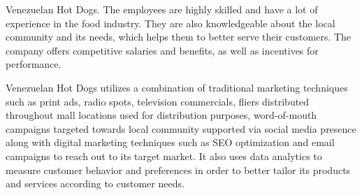 Venezuelan Hot Dogs. The employees are highly skilled and have a lot of experience in the food industry. They are also knowledgeable about the local community and its needs, which helps them to better serve their customers. The company offers competitive salaries and benefits, as well as incentives for performance. 

 Venezuelan Hot Dogs utilizes a combination of traditional marketing techniques such as print ads, radio spots, television commercials, fliers distributed throughout mall locations used for distribution purposes, word-of-mouth campaigns targeted towards local community supported via social media presence along with digital marketing techniques such as SEO optimization and email campaigns to reach out to its target market. It also uses data analytics to measure customer behavior and preferences in order to better tailor its products and services according to customer needs.